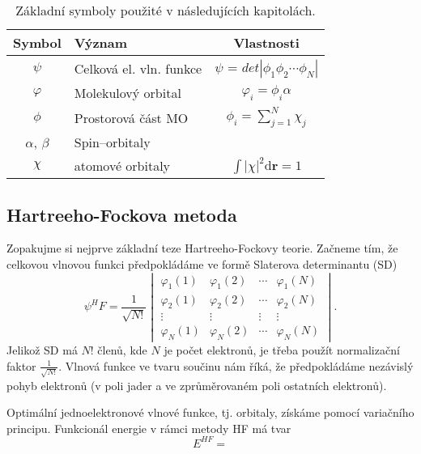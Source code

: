 \begin{table}[ht]
\centering
\caption{Základní symboly použité v následujících kapitolách.}
\begin{tabular}{|c|l|c|}
\hline 
\rule[-1ex]{0pt}{2.5ex} Symbol & 	Význam	& Vlastnosti \\ 
\hline 
\rule[-1ex]{0pt}{2.5ex} $\psi$ & Celková el. vln. funkce  & $\psi$ = $det|\phi_1 \phi_2 \cdots \phi_N |$ \\ 
\hline 
\rule[-1ex]{0pt}{2.5ex} $\varphi$ & Molekulový orbital & $\varphi_i=\phi_i \alpha $\\ 
\hline 
\rule[-1ex]{0pt}{2.5ex} $\phi$ & Prostorová část MO & $\phi_i=\sum_{j=1}^N \chi_j $ \\ 
\hline 
\rule[-1ex]{0pt}{2.5ex} $\alpha$, $\beta$  & Spin--orbitaly & \\ 
\hline 
\rule[-0ex]{0pt}{2.5ex} $\chi$ & atomové orbitaly & $\int |\chi|^2 \mathrm{d}\textbf{r} = 1 $ \\
\hline
\end{tabular} 
\label{tab:vlnfunkce}
\end{table}

\subsection{Hartreeho-Fockova metoda}

Zopakujme si nejprve základní teze Hartreeho-Fockovy teorie. Začneme tím, že celkovou vlnovou funkci předpokládáme ve formě Slaterova determinantu (SD)
\begin{equation}
\psi^HF=\frac{1}{\sqrt{N!}}\begin{vmatrix}
\varphi_1(1) & \varphi_1(2) & \cdots & \varphi_1(N) \\
\varphi_2(1) & \varphi_2(2) & \cdots & \varphi_2(N) \\
\vdots & \vdots & \vdots & \vdots \\
\varphi_N(1) & \varphi_N (2) & \cdots & \varphi_N(N)
\end{vmatrix}.
\end{equation}
Jelikož SD má $N!$ členů, kde $N$ je počet elektronů, je třeba použít normalizační faktor $\frac{1}{\sqrt{N!}}$. Vlnová funkce ve tvaru součinu nám říká, že předpokládáme nezávislý pohyb elektronů (v poli jader a ve zprůměrovaném poli ostatních elektronů).

Optimální jednoelektronové vlnové funkce, tj. orbitaly, získáme pomocí variačního principu. Funkcionál energie v rámci metody HF má tvar 
\begin{equation}
E^{HF}=  
\end{equation}


